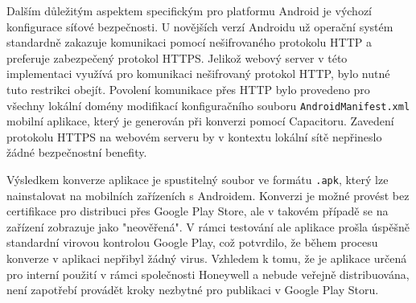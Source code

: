 Dalším důležitým aspektem specifickým pro platformu Android je výchozí konfigurace síťové bezpečnosti. U novějších verzí Androidu už operační systém standardně zakazuje komunikaci pomocí nešifrovaného protokolu HTTP a preferuje zabezpečený protokol HTTPS. Jelikož webový server v této implementaci využívá pro komunikaci nešifrovaný protokol HTTP, bylo nutné tuto restrikci obejít. Povolení komunikace přes HTTP bylo provedeno pro všechny lokální domény modifikací konfiguračního souboru \texttt{AndroidManifest.xml} mobilní aplikace, který je generován při konverzi pomocí Capacitoru. Zavedení protokolu HTTPS na webovém serveru by v kontextu lokální sítě nepřineslo žádné bezpečnostní benefity.
\cite{cleartextTraffic}

Výsledkem konverze aplikace je spustitelný soubor ve formátu \texttt{.apk}, který lze nainstalovat na mobilních zařízeních s Androidem. Konverzi je možné provést bez certifikace pro distribuci přes Google Play Store, ale v takovém případě se na zařízení zobrazuje jako "neověřená". V rámci testování ale aplikace prošla úspěšně standardní virovou kontrolou Google Play, což potvrdilo, že během procesu konverze v aplikaci nepřibyl žádný virus. Vzhledem k tomu, že je aplikace určená pro interní použití v rámci společnosti Honeywell a nebude veřejně distribuována, není zapotřebí provádět kroky nezbytné pro publikaci v Google Play Storu.


